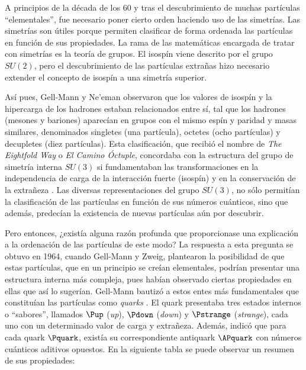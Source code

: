 A principios de la década de los 60 y tras el descubrimiento de muchas partículas ``elementales'', fue necesario poner cierto orden haciendo uso de las simetrías. Las simetrías son útiles porque permiten clasificar de forma ordenada las partículas en función de sus propiedades. La rama de las matemáticas encargada de tratar con simetrías es la teoría de grupos. El isospín viene descrito por el grupo $SU(2)$, pero el descubrimiento de las partículas extrañas hizo necesario extender el concepto de isospín a una simetría superior.

Así pues, Gell-Mann y Ne'eman observaron que los valores de isospín y la hipercarga de los hadrones estaban relacionados entre sí, tal que los hadrones (mesones y bariones) aparecían en grupos con el mismo espín y paridad y masas similares, denominados singletes (una partícula), octetes (ocho partículas) y decupletes (diez partículas).  Esta clasificación, que recibió el nombre de \textit{The Eightfold Way} o \textit{El Camino Óctuple}, concordaba con la estructura del grupo de simetría interna $SU(3)$ si fundamentaban las transformaciones en la independencia de carga de la interacción fuerte (isospín) y en la conservación de la extrañeza \cite{notas2020}. Las diversas representaciones del grupo $SU(3)$, no sólo permitían la clasificación de las partículas en función de sus números cuánticos, sino que además, predecían la existencia de nuevas partículas aún por descubrir. 

Pero entonces, ¿existía alguna razón profunda que proporcionase una explicación a la ordenación de las partículas de este modo? La respuesta a esta pregunta se obtuvo en 1964, cuando Gell-Mann y Zweig, plantearon la posibilidad de que estas partículas, que en un principio se creían elementales, podrían presentar una estructura interna más compleja, pues habían observado ciertas propiedades en ellas que así lo sugerían. Gell-Mann bautizó a estos entes más fundamentales que constituían las partículas como \textit{quarks} \cite{Griffiths2008}. El quark presentaba tres estados internos o ``sabores'', llamados $\Pup$ (\textit{up}), $\Pdown$ (\textit{down}) y $\Pstrange$ (\textit{strange}), cada uno con un determinado valor de carga y extrañeza. Además, indicó que para cada quark $\Pquark$, existía su correspondiente antiquark $\APquark$ con números cuánticos aditivos opuestos. En la siguiente tabla se puede observar un resumen de sus propiedades:

